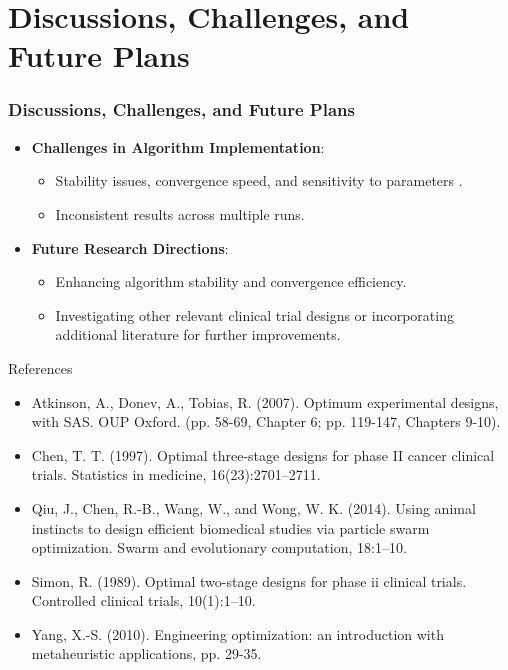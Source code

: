 \documentclass[xcolor=red]{beamer}
\begin{document}
\section{Discussions, Challenges, and Future Plans}
\begin{frame}
\frametitle{Discussions, Challenges, and Future Plans}
\begin{itemize}
    \item \textbf{Challenges in Algorithm Implementation}:
    \begin{itemize}
        \item Stability issues, convergence speed, and sensitivity to parameters .
        \item Inconsistent results across multiple runs.
    \end{itemize}
    
    \item \textbf{Future Research Directions}:
    \begin{itemize}
        \item Enhancing algorithm stability and convergence efficiency.
        \item Investigating other relevant clinical trial designs or incorporating additional literature for further improvements.
    \end{itemize}
\end{itemize}
\end{frame}


\begin{frame}{References}
\small %
\begin{itemize}
	\item Atkinson, A., Donev, A., Tobias, R. (2007). Optimum experimental designs, with SAS. OUP Oxford. (pp. 58-69, Chapter 6; pp. 119-147, Chapters 9-10).
	\item Chen, T. T. (1997). Optimal three-stage designs for phase II cancer clinical trials. Statistics in medicine, 16(23):2701–2711.
	\item Qiu, J., Chen, R.-B., Wang, W., and Wong, W. K. (2014). Using animal instincts to design efficient biomedical studies via particle swarm optimization. Swarm and evolutionary computation, 18:1–10.
    \item Simon, R. (1989). Optimal two-stage designs for phase ii clinical trials. Controlled clinical trials, 10(1):1–10.
    \item Yang, X.-S. (2010). Engineering optimization: an introduction with metaheuristic applications, pp. 29-35.
    
\end{itemize}
\end{frame}
\end{document}
